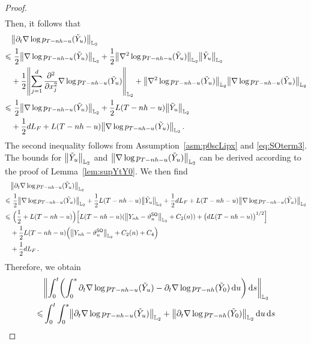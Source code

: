\begin{proof}
\begin{align*}
\end{align*}
Then, it follows that
\begin{align*}
    &\l|\partial_t\nabla\log p_{T-nh-u}(\tilde Y_u)\r|_{\Ltwo}\\
    \leqslant&\,\, \dfrac{1}{2}\l|\nabla\log p_{T-nh-u}(\tilde Y_u)\r|_{\Ltwo}+\dfrac{1}{2}\l|\nabla^2\log p_{T-nh-u}(\tilde Y_u)\r|_{\Ltwo}\l|\tilde Y_u\r|_{\Ltwo}\\
    &+\dfrac{1}{2}\l|\sum_{j=1}^d\dfrac{\partial^2}{\partial x_j^2}\nabla\log p_{T-nh-u}(\tilde Y_u)\r|_{\Ltwo}+\l|\nabla^2\log p_{T-nh-u}(\tilde Y_u)\r|_{\Ltwo}\l|\nabla\log p_{T-nh-u}(\tilde Y_u)\r|_{\Ltwo}\\
    \leqslant&\,\, \dfrac{1}{2}\l|\nabla\log p_{T-nh-u}(\tilde Y_u)\r|_{\Ltwo}+\dfrac{1}{2}L(T-nh-u)\l|\tilde Y_u\r|_{\Ltwo}\\
    &+\dfrac{1}{2}dL_F+L(T-nh-u)\l|\nabla\log p_{T-nh-u}(\tilde Y_u)\r|_{\Ltwo}\,.
\end{align*}
The second inequality follows from Assumption~\ref{asm:p0scLipx} and \eqref{eq:SOterm3}. 
The bounds for $\l|\tilde Y_u\r|_{\Ltwo}$ and $\l|\nabla\log p_{T-nh-u}(\tilde Y_u)\r|_{\Ltwo}$ can be derived according to the proof of Lemma~\ref{lem:supYtY0}. 
We then find
\begin{align}
    &\l|\partial_t\nabla\log p_{T-nh-u}(\tilde{Y}_u)\r|_{\Ltwo}\\
    \leqslant&\,\,\dfrac{1}{2}\l|\nabla\log p_{T-nh-u}(\tilde{Y}_u)\r|_{\Ltwo}+\dfrac{1}{2}L(T-nh-u)\l|\tilde{Y}_u\r|_{\Ltwo}+\dfrac{1}{2}dL_F+L(T-nh-u)\l|\nabla\log p_{T-nh-u}(\tilde{Y}_u)\r|_{\Ltwo}\\
    \leqslant&\,\,\Big(\dfrac{1}{2}+L(T-nh-u)\Big)\left[L(T-nh-u)(\l|Y_{nh}-\vartheta_n^{\sf SO}\r|_{\Ltwo}+C_2(n))+\big(dL(T-nh-u)\big)^{1/2}\right]\\
    &+\dfrac{1}{2}L(T-nh-u)\Big(\l|Y_{nh}-\vartheta_n^{\sf SO}\r|_{\Ltwo}+C_2(n)+C_4\Big)\\
    &+\dfrac{1}{2}dL_F\,.
\end{align}
Therefore, we obtain
\begin{equation}
    \begin{aligned}
        &\l|\int_0^t\left(\int_0^s\partial_t\nabla\log p_{T-nh-u}(\tilde{Y}_u)-\partial_t\nabla\log p_{T-nh}(\tilde{Y}_0)\rmd u\right)\rmd s\r|_{\Ltwo}\\
        \leqslant& \int_0^t\int_0^s\l|\partial_t\nabla\log p_{T-nh-u}(\tilde{Y}_u)\r|_{\Ltwo}+\l|\partial_t\nabla\log p_{T-nh}(\tilde{Y}_0)\r|_{\Ltwo}\rmd u\rmd s\\

\end{aligned}
\end{equation}
\end{proof}
